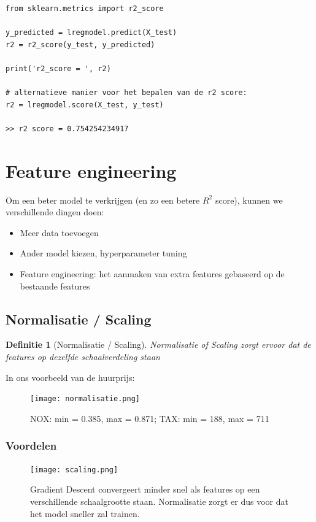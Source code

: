 \documentclass{article}
\newtheorem{theorem}{Definitie}[section]
\begin{document}
\begin{verbatim}
from sklearn.metrics import r2_score

y_predicted = lregmodel.predict(X_test)
r2 = r2_score(y_test, y_predicted)

print('r2_score = ', r2)

# alternatieve manier voor het bepalen van de r2 score:
r2 = lregmodel.score(X_test, y_test)

>> r2 score = 0.754254234917
\end{verbatim}

\section{Feature engineering}

Om een beter model te verkrijgen (en zo een betere $R^2$ score), kunnen we verschillende dingen doen:

\begin{itemize}
    \item Meer data toevoegen
    \item Ander model kiezen, hyperparameter tuning
    \item Feature engineering: het aanmaken van extra features gebaseerd op de bestaande features
\end{itemize}

\subsection{Normalisatie / Scaling}

\begin{theorem}[Normalisatie / Scaling]
Normalisatie of Scaling zorgt ervoor dat de features op dezelfde schaalverdeling staan
\end{theorem}

In ons voorbeeld van de huurprijs:

\begin{figure}[H]
    \centering
    \texttt{[image: normalisatie.png]}
    \caption{NOX: min = 0.385, max = 0.871; TAX: min = 188, max = 711}
\end{figure}

\subsubsection{Voordelen}

\begin{figure}[H]
    \centering
    \texttt{[image: scaling.png]}
    \caption{Gradient Descent convergeert minder snel als features op een verschillende schaalgrootte staan. Normalisatie zorgt er dus voor dat het model sneller zal trainen.}
\end{figure}
\end{document}
